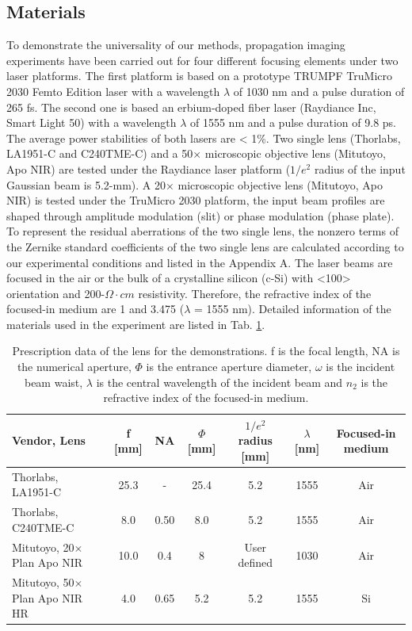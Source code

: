 \documentclass[9pt,twocolumn,twoside]{osajnl}
\begin{document}
\subsection{Materials}
To demonstrate the universality of our methods, propagation imaging experiments have been carried out for four different focusing elements under two laser platforms. The first platform is based on a prototype TRUMPF TruMicro 2030 Femto Edition laser with a wavelength $\lambda$ of 1030 nm and a pulse duration of 265 fs. The second one is based an erbium-doped fiber laser (Raydiance Inc, Smart Light 50) with a wavelength $\lambda$ of 1555 nm and a pulse duration of 9.8 ps. The average power stabilities of both lasers are < 1\%. Two single lens (Thorlabs, LA1951-C and C240TME-C) and a 50$\times$ microscopic objective lens (Mitutoyo, Apo NIR) are tested under the Raydiance laser platform ($1/e^2$ radius of the input Gaussian beam is 5.2-mm). A 20$\times$ microscopic objective lens (Mitutoyo, Apo NIR) is tested under the TruMicro 2030 platform, the input beam profiles are shaped through amplitude modulation (slit) or phase modulation (phase plate). To represent the residual aberrations of the two single lens, the nonzero terms of the Zernike standard coefficients of the two single lens are calculated according to our experimental conditions and listed in the Appendix A. The laser beams are focused in the air or the bulk of a crystalline silicon (c-Si) with <100> orientation and 200-$\Omega\cdot cm$ resistivity. Therefore, the refractive index of the focused-in medium are 1 and 3.475 ($\lambda$ = 1555 nm). Detailed information of the materials used in the experiment are listed in Tab. \ref{tab:1}.
\begin{table}
	\centering
	\begin{tabular}[c]{|l|c|c|c|c|c|c|}
		\hline
		\rowcolor{gray}
		Vendor, Lens& f [mm]& NA & $\Phi$ [mm] & $1/e^2$ radius [mm] & $\lambda$ [nm]& Focused-in medium\\
		\hline
		Thorlabs, LA1951-C & 25.3 & - & 25.4 & 5.2 & 1555 & Air \\
		\rowcolor{lightgray}
		Thorlabs, C240TME-C & 8.0 & 0.50 & 8.0 & 5.2 & 1555 & Air\\
		Mitutoyo, 20$\times$ Plan Apo NIR & 10.0 & 0.4 & 8 & User defined & 1030 & Air\\
		\rowcolor{lightgray}
		Mitutoyo, 50$\times$ Plan Apo NIR HR & 4.0 & 0.65 & 5.2 & 5.2 & 1555 & Si\\
		\hline
	\end{tabular}	
	\caption{Prescription data of the lens for the demonstrations. f is the focal length, NA is the numerical aperture, $\Phi$ is the entrance aperture diameter, $\omega$ is the incident beam waist, $\lambda$ is the central wavelength of the incident beam and $n_2$ is the refractive index of the focused-in medium.}\label{tab:1}
\end{table}
\end{document}
